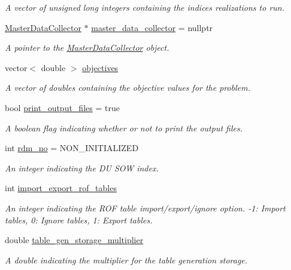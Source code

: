 \begin{DoxyCompactItemize}
\begin{DoxyCompactList}\small\item\em A vector of unsigned long integers containing the indices realizations to run. \end{DoxyCompactList}\item 
\mbox{\hyperlink{classMasterDataCollector}{Master\+Data\+Collector}} $\ast$ \mbox{\hyperlink{classProblem_a6cd1db1d587a449985d6514390ba8c96}{master\+\_\+data\+\_\+collector}} = nullptr
\begin{DoxyCompactList}\small\item\em A pointer to the \mbox{\hyperlink{classMasterDataCollector}{Master\+Data\+Collector}} object. \end{DoxyCompactList}\item 
vector$<$ double $>$ \mbox{\hyperlink{classProblem_a72750ee8c8117f5ee9b190a359d6a60d}{objectives}}
\begin{DoxyCompactList}\small\item\em A vector of doubles containing the objective values for the problem. \end{DoxyCompactList}\item 
bool \mbox{\hyperlink{classProblem_a3372a73270ce989f5d2056cace66215b}{print\+\_\+output\+\_\+files}} = true
\begin{DoxyCompactList}\small\item\em A boolean flag indicating whether or not to print the output files. \end{DoxyCompactList}\item 
int \mbox{\hyperlink{classProblem_a8e1d46a8dca514e4973b00a038480fc2}{rdm\+\_\+no}} = N\+O\+N\+\_\+\+I\+N\+I\+T\+I\+A\+L\+I\+Z\+ED
\begin{DoxyCompactList}\small\item\em An integer indicating the DU S\+OW index. \end{DoxyCompactList}\item 
int \mbox{\hyperlink{classProblem_ac5a286f34cec786a0ad56c77783a201c}{import\+\_\+export\+\_\+rof\+\_\+tables}}
\begin{DoxyCompactList}\small\item\em An integer indicating the R\+OF table import/export/ignore option. -\/1\+: Import tables, 0\+: Ignore tables, 1\+: Export tables. \end{DoxyCompactList}\item 
double \mbox{\hyperlink{classProblem_a27cae146b3409021f6d5936404cd1083}{table\+\_\+gen\+\_\+storage\+\_\+multiplier}}
\begin{DoxyCompactList}\small\item\em A double indicating the multiplier for the table generation storage. \end{DoxyCompactList}\item 

\end{DoxyCompactItemize}
